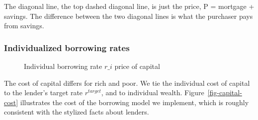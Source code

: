 {  
The diagonal line, the top dashed diagonal line, is just the price, P = mortgage + savings.
The difference between the two diagonal lines is what the purchaser pays from savings.  

\subsubsection{Individualized borrowing rates} \label{sec:borowing-rate}

    \begin{figure}
    \centering
    \label{fig-capital-cost}
    \caption{Individual borrowing rate $r\_i$ price of capital}
    \label{fig:Wealth-based}
    \end{figure}

The cost of capital differs for rich and poor. We tie the individual cost of capital %
to the lender's target rate $r^{target}$, and to individual wealth. Figure~\ref{fig-capital-cost} illustrates the cost of the borrowing model we implement, which is  roughly consistent  with the stylized facts about lenders. 
 
}
